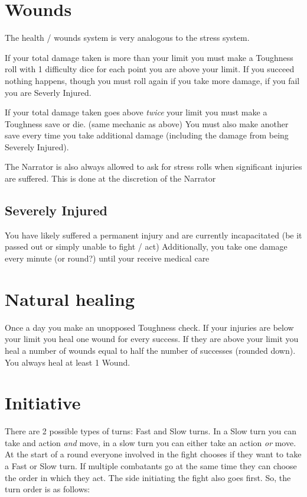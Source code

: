 \section{Wounds}
The health / wounds system is very analogous to the stress system.

If your total damage taken is more than your limit you must make a Toughness roll with 1 difficulty dice for each point you are above your limit.  
If you succeed nothing happens, though you must roll again if you take more damage, if you fail you are Severly Injured.

If your total damage taken goes above \textit{twice} your limit you must make a Toughness save or die. (same mechanic as above)  
You must also make another save every time you take additional damage (including the damage from being Severely Injured).

The Narrator is also always allowed to ask for stress rolls when significant injuries are suffered. This is done at the discretion of the Narrator


\subsection{Severely Injured}
You have likely suffered a permanent injury and are currently incapacitated (be it passed out or simply unable to fight / act)
Additionally, you take one damage every minute (or round?) until your receive medical care


\section{Natural healing}
Once a day you make an unopposed Toughness check. 
If your injuries are below your limit you heal one wound for every success. 
If they are above your limit you heal a number of wounds equal to half the number of successes (rounded down).
You always heal at least 1 Wound.

\section{Initiative}
There are 2 possible types of turns: Fast and Slow turns.  
In a Slow turn you can take and action \textit{and} move, in a slow turn you can either take an action \textit{or} move.  
At the start of a round everyone involved in the fight chooses if they want to take a Fast or Slow turn.
If multiple combatants go at the same time they can choose the order in which they act.
The side initiating the fight also goes first. So, the turn order is as follows: 

